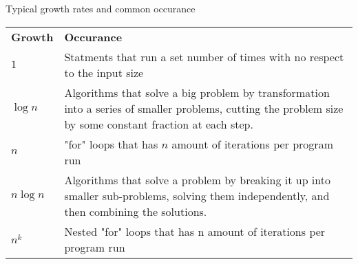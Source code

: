 \begin{theorem}
    {Typical growth rates and common occurance}
    \begin{tabular}{|l|p{}|}
        \hline
        \textbf{Growth} & \textbf{Occurance}                                                                                                                                        \\
        $1$             & Statments that run a set number of times with no respect to the input size                                                                                \\
        \hline
        $\log n$        & Algorithms that solve a big problem by transformation into a series of smaller problems, cutting the problem size by some constant fraction at each step. \\
        \hline
        $n$             & "for" loops that has $n$ amount of iterations per program run                                                                                             \\
        \hline
        $n\log n$       & Algorithms that solve a problem by breaking it up into smaller sub-problems, solving them independently, and then combining the solutions.                \\
        \hline
        $n^k$           & Nested "for" loops that has n amount of iterations per program run                                                                                        \\
        \hline
    \end{tabular}
\end{theorem}